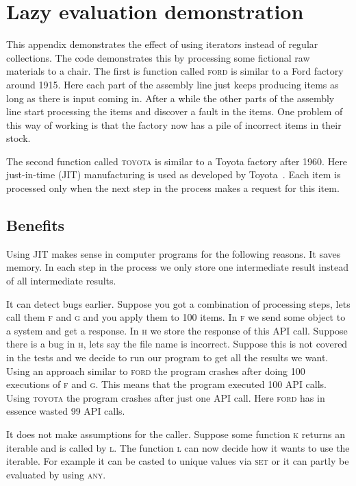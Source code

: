 \chapter{Lazy evaluation demonstration}
\label{ch:demonstration}

This appendix demonstrates the effect of using iterators instead of regular collections.
The code demonstrates this by processing some fictional raw materials to a chair.
The first is function called \textsc{ford} is similar to a Ford factory around 1915.
Here each part of the assembly line just keeps producing items as long as there is input coming in.
After a while the other parts of the assembly line start processing the items and discover a fault in the items.
One problem of this way of working is that the factory now has a pile of incorrect items in their stock.

The second function called \textsc{toyota} is similar to a Toyota factory after 1960.
Here just-in-time (JIT) manufacturing is used as developed by Toyota~\citep{ohno1988toyota}.
Each item is processed only when the next step in the process makes a request for this item.

\section{Benefits}
\label{sec:benefits}
Using JIT makes sense in computer programs for the following reasons.
It saves memory.
In each step in the process we only store one intermediate result instead of all intermediate results.

It can detect bugs earlier.
Suppose you got a combination of processing steps, lets call them \textsc{f} and \textsc{g} and you apply them to 100 items.
In \textsc{f} we send some object to a system and get a response.
In \textsc{h} we store the response of this API call.
Suppose there is a bug in \textsc{h}, lets say the file name is incorrect.
Suppose this is not covered in the tests and we decide to run our program to get all the results we want.
Using an approach similar to \textsc{ford} the program crashes after doing 100 executions of \textsc{f} and \textsc{g}.
This means that the program executed 100 API calls.
Using \textsc{toyota} the program crashes after just one API call.
Here \textsc{ford} has in essence wasted 99 API calls.

It does not make assumptions for the caller.
Suppose some function \textsc{k} returns an iterable and is called by \textsc{l}.
The function \textsc{l} can now decide how it wants to use the iterable.
For example it can be casted to unique values via \textsc{set} or it can partly be evaluated by using \textsc{any}.

